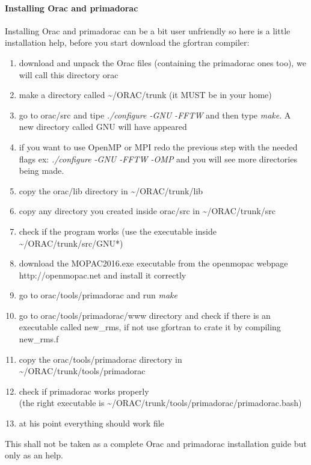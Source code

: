 	\paragraph{Installing Orac and primadorac}
	
		Installing Orac and primadorac can be a bit user unfriendly so here is a little installation help, before you start download the gfortran compiler:
		\begin{enumerate}
			\item download and unpack the Orac files (containing the primadorac ones too), we will call this directory orac
			
			\item make a directory called \textasciitilde/ORAC/trunk (it MUST be in your home)
			
			\item go to orac/src and tipe \emph{./configure -GNU -FFTW} and then type \emph{make}. A new directory called GNU will have appeared
			
			\item if you want to use OpenMP or MPI redo the previous step with the needed flags ex: \emph{./configure -GNU -FFTW -OMP} and you will see more directories being made.
			
			\item copy the orac/lib directory in \textasciitilde/ORAC/trunk/lib
			
			\item copy any directory you created inside orac/src in \textasciitilde/ORAC/trunk/src
			
			\item check if the program works (use the executable inside \textasciitilde/ORAC/trunk/src/GNU*)
			
			\item download the MOPAC2016.exe executable from the openmopac webpage http://openmopac.net and install it correctly
			
			\item go to orac/tools/primadorac and run \emph{make}
			
			\item go to orac/tools/primadorac/www directory and check if there is an executable called new\_rms, if not use gfortran to crate it by compiling new\_rms.f
			
			\item copy the orac/tools/primadorac directory in \textasciitilde/ORAC/trunk/tools/primadorac
			
			\item check if primadorac works properly\\
			(the right executable is  \textasciitilde/ORAC/trunk/tools/primadorac/primadorac.bash)
			
			\item at his point everything should work file
			
		\end{enumerate}
	
		This shall not be taken as a complete Orac and primadorac installation guide but only as an help.
